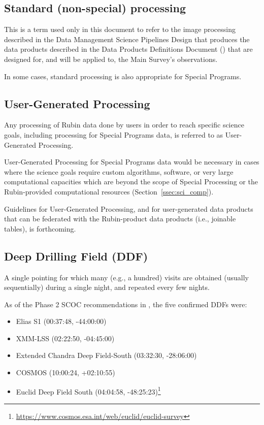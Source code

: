 \subsection{Standard (non-special) processing}

This is a term used only in this document to refer to the image processing 
described in the Data Management Science Pipelines Design  that produces the data products described in the Data Products Definitions Document
() that are designed for, and will be applied to, the Main Survey's observations.

In some cases, standard processing is also appropriate for Special Programs.


\subsection{User-Generated Processing}

Any processing of Rubin data done by users in order to reach specific science goals, including
processing for Special Programs data, is referred to as User-Generated Processing.

User-Generated Processing for Special Programs data would be necessary in cases where
the science goals require custom algorithms, software, or very large computational
capacities which are beyond the scope of Special Processing or the Rubin-provided
computational resources (Section~\ref{ssec:sci_comp}).

Guidelines for User-Generated Processing, and for user-generated data products
that can be federated with the Rubin-product data products (i.e., joinable tables),
is forthcoming.

\subsection{Deep Drilling Field (DDF)}

A single pointing for which many (e.g., a hundred) visits are obtained 
(usually sequentially) during a single night, and repeated every few 
nights.

As of the Phase 2 SCOC recommendations in , the five 
confirmed DDFs were:

\begin{itemize}
\item Elias S1 (00:37:48, -44:00:00)
\item XMM-LSS (02:22:50, -04:45:00)
\item Extended Chandra Deep Field-South (03:32:30, -28:06:00)
\item COSMOS (10:00:24, +02:10:55)
\item Euclid Deep Field South  (04:04:58, -48:25:23)\footnote{\url{https://www.cosmos.esa.int/web/euclid/euclid-survey}}
\end{itemize}

